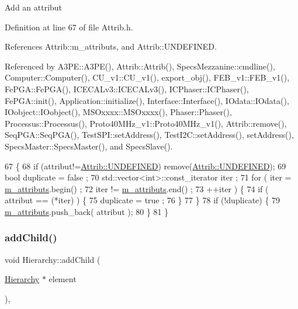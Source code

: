 Add an attribut 

Definition at line 67 of file Attrib.\+h.



References Attrib\+::m\+\_\+attributs, and Attrib\+::\+U\+N\+D\+E\+F\+I\+N\+ED.



Referenced by A3\+P\+E\+::\+A3\+P\+E(), Attrib\+::\+Attrib(), Specs\+Mezzanine\+::cmdline(), Computer\+::\+Computer(), C\+U\+\_\+v1\+::\+C\+U\+\_\+v1(), export\+\_\+obj(), F\+E\+B\+\_\+v1\+::\+F\+E\+B\+\_\+v1(), Fe\+P\+G\+A\+::\+Fe\+P\+G\+A(), I\+C\+E\+C\+A\+Lv3\+::\+I\+C\+E\+C\+A\+Lv3(), I\+C\+Phaser\+::\+I\+C\+Phaser(), Fe\+P\+G\+A\+::init(), Application\+::initialize(), Interface\+::\+Interface(), I\+Odata\+::\+I\+Odata(), I\+Oobject\+::\+I\+Oobject(), M\+S\+Oxxxx\+::\+M\+S\+Oxxxx(), Phaser\+::\+Phaser(), Processus\+::\+Processus(), Proto40\+M\+Hz\+\_\+v1\+::\+Proto40\+M\+Hz\+\_\+v1(), Attrib\+::remove(), Seq\+P\+G\+A\+::\+Seq\+P\+G\+A(), Test\+S\+P\+I\+::set\+Address(), Test\+I2\+C\+::set\+Address(), set\+Address(), Specs\+Master\+::\+Specs\+Master(), and Specs\+Slave().


\begin{DoxyCode}
67                             \{
68     \textcolor{keywordflow}{if} (attribut!=\hyperlink{classAttrib_a69e171d7cc6417835a5a306d3c764235a3a8da2ab97dda18aebab196fe4100531}{Attrib::UNDEFINED}) \textcolor{keyword}{remove}(\hyperlink{classAttrib_a69e171d7cc6417835a5a306d3c764235a3a8da2ab97dda18aebab196fe4100531}{Attrib::UNDEFINED});
69     \textcolor{keywordtype}{bool} duplicate = false ;
70     std::vector<int>::const\_iterator iter ;
71     \textcolor{keywordflow}{for} ( iter  = \hyperlink{classAttrib_ac4bd58a0cc6b38a3b711d609a3d3aacc}{m\_attributs}.begin() ;
72           iter != \hyperlink{classAttrib_ac4bd58a0cc6b38a3b711d609a3d3aacc}{m\_attributs}.end()   ;
73           ++iter ) \{
74       \textcolor{keywordflow}{if} ( attribut == (*iter) ) \{
75         duplicate = true ;
76       \}
77     \}
78     \textcolor{keywordflow}{if} (!duplicate) \{
79       \hyperlink{classAttrib_ac4bd58a0cc6b38a3b711d609a3d3aacc}{m\_attributs}.push\_back( attribut );
80     \}
81   \}
\end{DoxyCode}
\mbox{\label{classHierarchy_ad677774ff38fcb257c04a3a10d471fac}} 
\subsubsection{\texorpdfstring{add\+Child()}{addChild()}}
{\footnotesize\ttfamily void Hierarchy\+::add\+Child (\begin{DoxyParamCaption}\item[{\hyperlink{classHierarchy}{Hierarchy} $\ast$}]{element }\end{DoxyParamCaption})\hspace{0.3cm}{\ttfamily [virtual]}, {\ttfamily [inherited]}}



